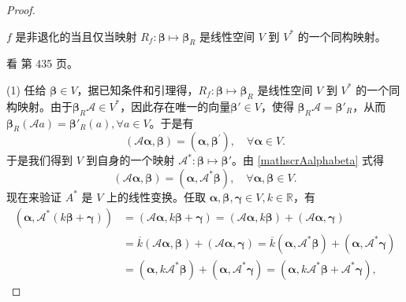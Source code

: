 \begin{enumerate}[1~]
\begin{proof}
\begin{lemma}
$f$ 是非退化的当且仅当映射 $R_f: \boldsymbol{\beta}\longmapsto \boldsymbol{\beta}_R$ 是线性空间 $V$ 到 $V^*$ 的一个同构映射。
\end{lemma}
\begin{subproof}
看\cite{qiugaoxia} 第 435 页。
\end{subproof}
(1) 任给 $\boldsymbol{\beta}\in V$，据已知条件和引理得，$R_f: \boldsymbol{\beta}\longmapsto \boldsymbol{\beta}_R$ 是线性空间 $V$ 到 $V^*$ 的一个同构映射。由于$\boldsymbol{\beta}_R \mathscr{A} \in V^*$，因此存在唯一的向量$\boldsymbol{\beta}' \in V$，使得 $\boldsymbol{\beta}_R\mathscr{A} = \boldsymbol{\beta}'_R$，从而$\boldsymbol{\beta}_R (\mathscr{A}a) = \boldsymbol{\beta}'_R(a), \forall a\in V$。于是有\begin{equation}\label{mathscrAalphabeta}
\left(\mathscr{A}{{\boldsymbol{\alpha}}}, \boldsymbol{\beta}\right)=\left(\boldsymbol{\alpha}, \boldsymbol{\beta}^{\prime}\right), \quad \forall \boldsymbol{\alpha} \in V.
\end{equation}
于是我们得到 $V$ 到自身的一个映射 $\mathscr{A}^* : \boldsymbol{\beta} \longmapsto \boldsymbol{\beta}'$。由 \eqref{mathscrAalphabeta} 式得
\begin{equation}\label{alphaA*beta}
\left(\mathscr{A}{\boldsymbol{\alpha}}, \boldsymbol{\beta}\right) = \left(\boldsymbol{\alpha}, \mathscr{A}^{*} \boldsymbol{\beta}\right), \quad \forall \boldsymbol{\alpha}, \boldsymbol{\beta} \in V.
\end{equation}
现在来验证 $A^*$ 是 $V$ 上的线性变换。任取 $\boldsymbol{\alpha}, \boldsymbol{\beta}, \boldsymbol{\gamma} \in V, k\in \mathbb{R}$，有
\begin{align*}
\left(\boldsymbol{\alpha}, \mathscr{A}^{*}(k \boldsymbol{\beta}+\boldsymbol{\gamma})\right)
&=\left(\mathscr{A}{\boldsymbol{\alpha}}, k \boldsymbol{\beta}+\boldsymbol{\gamma}\right)=\left(\mathscr{A}{\boldsymbol{\alpha}}, k \boldsymbol{\beta}\right)+\left(\mathscr{A}{\boldsymbol{\alpha}}, \boldsymbol{\gamma}\right)\\
&=\overline{k}\left(\mathscr{A}{\boldsymbol{\alpha}}, \boldsymbol{\beta}\right)+\left(\mathscr{A}{\boldsymbol{\alpha}}, \boldsymbol{\gamma}\right)=\overline{k}(\boldsymbol{\alpha}, \mathscr{A}^* \boldsymbol{\beta})+(\boldsymbol{\alpha}, \mathscr{A}^*  \boldsymbol{\gamma})\\
&=(\boldsymbol{\alpha}, k \mathscr{A}^* \boldsymbol{\beta})+(\boldsymbol{\alpha}, \mathscr{A}  ^*\boldsymbol{\gamma})=(\boldsymbol{\alpha}, k \mathscr{A}^*\boldsymbol{\beta}+\mathscr{A} ^* \boldsymbol{\gamma}),
\end{align*}

\end{proof}
\end{enumerate}
